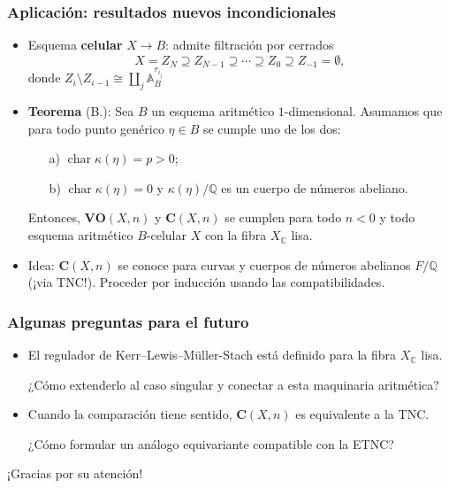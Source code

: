 \documentclass[handout]{beamer}
\newcommand{\CC}{\mathbb{C}}
\newcommand{\QQ}{\mathbb{Q}}
\DeclareMathOperator{\fchar}{char}
\renewcommand{\AA}{\mathbb{A}}
\begin{document}
\begin{frame}
  \frametitle{Aplicación: resultados nuevos incondicionales}

  \begin{itemize}
  \item<2-> Esquema \textbf{celular} $X \to B$: admite filtración por
    cerrados
    \[ X = Z_N \supseteq Z_{N-1} \supseteq \cdots \supseteq Z_0 \supseteq Z_{-1} = \emptyset, \]
    donde $Z_i\setminus Z_{i-1} \cong \coprod_j \AA^{r_{i_j}}_B$

  \item<3-> \textbf{Teorema} (B.): Sea $B$ un esquema aritmético
    $1$-dimensional. Asumamos que para todo punto genérico $\eta \in B$ se
    cumple uno de los dos:
    \begin{enumerate}
    \item[a)] $\fchar \kappa (\eta) = p > 0$;

    \item[b)] $\fchar \kappa (\eta) = 0$ y $\kappa (\eta)/\QQ$ es un cuerpo de
      números abeliano.
    \end{enumerate}

    Entonces, $\mathbf{VO} (X,n)$ y $\mathbf{C} (X,n)$ se cumplen para todo
    $n < 0$ y todo esquema aritmético $B$-celular $X$ con la fibra $X_\CC$ lisa.

  \item<4-> Idea: $\mathbf{C} (X,n)$ se conoce para curvas y cuerpos de números
    abelianos $F/\QQ$ (¡via TNC!). Proceder por inducción usando las
    compatibilidades.
  \end{itemize}
\end{frame}


\begin{frame}
  \frametitle{Algunas preguntas para el futuro}

  \begin{itemize}
  \item<2-> El regulador de Kerr--Lewis--Müller-Stach está definido para la
    fibra $X_\CC$ lisa.

    ¿Cómo extenderlo al caso singular y conectar a esta maquinaria aritmética?

  \item<3-> Cuando la comparación tiene sentido, $\mathbf{C} (X,n)$ es
    equivalente a la TNC.

    ¿Cómo formular un análogo equivariante compatible con la ETNC?
  \end{itemize}
\end{frame}


\begin{frame}[plain]
  \headingfont

  \begin{center}
    {\huge ¡Gracias por su atención!}
  \end{center}
\end{frame}
\end{document}
